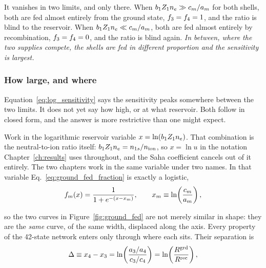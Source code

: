It vanishes in two limits, and only there. When $b_1Z_{1}n_e \gg
c_m/a_m$ for both shells, both are fed almost entirely from the ground state,
$f_{3} = f_{4} = 1$, and the ratio is blind to the reservoir. When
$b_1Z_{1}n_e \ll c_m/a_m$, both are fed almost entirely by recombination,
$f_{3} = f_{4} = 0$, and the ratio is blind again. \emph{In between, where the two supplies compete, the shells
are fed in different proportion and the sensitivity is largest.}

\subsubsection*{How large, and where}

Equation~\eqref{eq:log_sensitivity} says the sensitivity peaks somewhere between
the two limits. It does not yet say how high, or at what reservoir. Both follow
in closed form, and the answer is more restrictive than one might expect.

Work in the logarithmic reservoir variable $x = \ln(b_1Z_{1}n_e)$. That
combination is the neutral-to-ion ratio itself: $b_1Z_{1}n_e = n_{1s}/n_{\mathrm{ion}}$,
so $x = \ln u$ in the notation Chapter~\ref{ch:results} uses throughout, and the
Saha coefficient cancels out of it entirely. The two chapters work in the same
variable under two names.
In that variable Eq.~\eqref{eq:ground_fed_fraction} is exactly a logistic,
\begin{equation}
  f_{m}(x) = \frac{1}{1 + e^{-(x - x_m)}},
  \qquad x_m \equiv \ln\!\left(\frac{c_m}{a_m}\right),
  \label{eq:f_logistic}
\end{equation}

\noindent so the two curves in Figure~\ref{fig:ground_fed} are not merely
similar in shape: they are the \emph{same} curve, of the same width, displaced
along the axis. Every property of the 42-state network enters only through where
each sits. Their separation is
\begin{equation}
  \Delta \equiv x_4 - x_3
  = \ln\!\left(\frac{a_3/a_4}{c_3/c_4}\right)
  = \ln\!\left(\frac{R^{\rm grd}}{R^{\rm rec}}\right),
  \label{eq:logistic_separation}
\end{equation}

